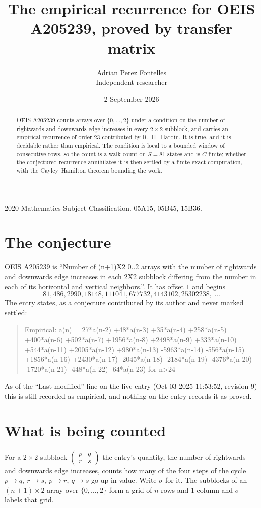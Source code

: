 \documentclass[11pt,a4paper]{article}
\title{The empirical recurrence for OEIS A205239, proved by transfer matrix}
\author{Adrian Perez Fontelles\\ \small Independent researcher}
\date{2 September 2026}
\theoremstyle{plain}
\theoremstyle{definition}
\begin{document}
\maketitle

\begin{abstract}
OEIS A205239 counts arrays over $\{0,\dots,2\}$ under a condition on the number of rightwards and downwards edge increases
in every $2\times2$ subblock, and carries an empirical recurrence of order $23$ contributed by
R.~H.~Hardin. It is true, and it is decidable rather than empirical. The condition is local to
a bounded window of consecutive rows, so the count is a walk count on $S=81$ states and is
$C$-finite; whether the conjectured recurrence annihilates it is then settled by a finite exact
computation, with the Cayley--Hamilton theorem bounding the work.
\end{abstract}

\noindent\small 2020 Mathematics Subject Classification. 05A15, 05B45, 15B36.\normalsize

\section{The conjecture}

OEIS A205239 is ``Number of (n+1)X2 0..2 arrays with the number of rightwards and downwards edge increases in each 2X2 subblock differing from the number in each of its horizontal and vertical neighbors.''. It has offset $1$ and begins
\[
81, 486, 2990, 18148, 111041, 677732, 4143102, 25302238,\ \dots
\]
The entry states, as a conjecture contributed by its author and never marked settled:
\begin{quote}
Empirical: a(n) = 27*a(n-2) +48*a(n-3) +35*a(n-4) +258*a(n-5) +400*a(n-6) +502*a(n-7) +1956*a(n-8) +2498*a(n-9) +333*a(n-10) +544*a(n-11) +2005*a(n-12) +980*a(n-13) -5963*a(n-14) -556*a(n-15) +1856*a(n-16) +2430*a(n-17) -2045*a(n-18) -2184*a(n-19) -4376*a(n-20) -1720*a(n-21) -448*a(n-22) -64*a(n-23) for n>24
\end{quote}
As of the ``Last modified'' line on the live entry (Oct 03 2025 11:53:52, revision 9) this is still
recorded as empirical, and nothing on the entry records it as proved.

\section{What is being counted}

For a $2\times2$ subblock $\begin{pmatrix}p&q\\r&s\end{pmatrix}$ the
entry's quantity, the number of rightwards and downwards edge increases, counts how many of the four steps of the cycle $p\to q,\ r\to s,\ p\to r,\ q\to s$ go up in value. Write $\sigma$ for it. The subblocks of an
$(n+1)\times2$ array over $\{0,\dots,2\}$ form a grid of $n$ rows and $1$
column and $\sigma$ labels that grid.
\end{document}

